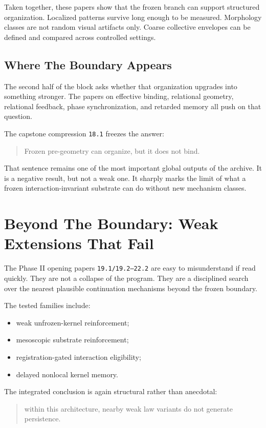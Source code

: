 \documentclass[11pt]{article}
\begin{document}
Taken together, these papers show that the frozen branch can support structured organization. Localized patterns survive long enough to be measured. Morphology classes are not random visual artifacts only. Coarse collective envelopes can be defined and compared across controlled settings.

\subsection{Where The Boundary Appears}

The second half of the block asks whether that organization upgrades into something stronger. The papers on effective binding, relational geometry, relational feedback, phase synchronization, and retarded memory all push on that question.

The capstone compression \texttt{18.1} freezes the answer:
\begin{quote}
Frozen pre-geometry can organize, but it does not bind.
\end{quote}

That sentence remains one of the most important global outputs of the archive. It is a negative result, but not a weak one. It sharply marks the limit of what a frozen interaction-invariant substrate can do without new mechanism classes.

\section{Beyond The Boundary: Weak Extensions That Fail}

The Phase II opening papers \texttt{19.1/19.2--22.2} are easy to misunderstand if read quickly. They are not a collapse of the program. They are a disciplined search over the nearest plausible continuation mechanisms beyond the frozen boundary.

The tested families include:
\begin{itemize}
\item weak unfrozen-kernel reinforcement;
\item mesoscopic substrate reinforcement;
\item registration-gated interaction eligibility;
\item delayed nonlocal kernel memory.
\end{itemize}

The integrated conclusion is again structural rather than anecdotal:
\begin{quote}
within this architecture, nearby weak law variants do not generate persistence.
\end{quote}
\end{document}
